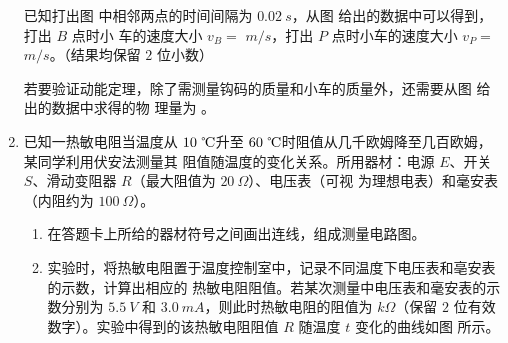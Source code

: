 \begin{enumerate}
已知打出图  中相邻两点的时间间隔为 $ 0.02 \ s $，从图  给出的数据中可以得到，打出 $ B $ 点时小
车的速度大小 $ v_{B} =$ \underlinegap $m/s $，打出 $ P $ 点时小车的速度大小 $ v_{P}=$ \underlinegap $m/s $。（结果均保留 $ 2 $ 位小数）

若要验证动能定理，除了需测量钩码的质量和小车的质量外，还需要从图  给出的数据中求得的物
理量为 \underlinegap 。








\newpage
\item 
已知一热敏电阻当温度从 $ 10 \ \celsius $升至 $ 60 \ \celsius $时阻值从几千欧姆降至几百欧姆，某同学利用伏安法测量其
阻值随温度的变化关系。所用器材：电源 $ E $、开关 $ S $、滑动变阻器 $ R $（最大阻值为 $ 20 \ \Omega $）、电压表（可视
为理想电表）和毫安表（内阻约为 $ 100 \ \Omega $）。
\begin{enumerate}
\item
在答题卡上所给的器材符号之间画出连线，组成测量电路图。
\begin{figure}[h!]
\centering

\end{figure}

\item 
实验时，将热敏电阻置于温度控制室中，记录不同温度下电压表和亳安表的示数，计算出相应的
热敏电阻阻值。若某次测量中电压表和毫安表的示数分别为 $ 5.5 \ V $ 和 $ 3.0 \ mA $，则此时热敏电阻的阻值为 \underlinegap 
$ k \Omega $（保留 $ 2 $ 位有效数字）。实验中得到的该热敏电阻阻值 $ R $ 随温度 $ t $ 变化的曲线如图  所示。
\begin{figure}[h!]
\centering
\begin{subfigure}{0.5\linewidth}
\centering
 
\caption{}\label{2020:全国3:10:2a}
\end{subfigure}
\hfil
\begin{subfigure}{0.4\linewidth}
\centering
 
\caption{}\label{2020:全国3:10:2b}
\end{subfigure}
\end{figure}


\end{enumerate}
\end{enumerate}
